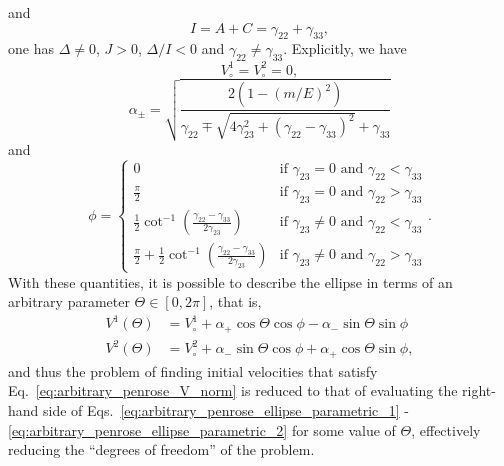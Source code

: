 %
and
%
\begin{equation}
  I = A + C = \gamma_{22} + \gamma_{33},
  \label{eq:arbitrary_penrose_quadratic_I}
\end{equation}
%
one has $\Delta \neq 0$, $J > 0$, $\Delta/I < 0$ and $\gamma_{22} \neq \gamma_{33}$. Explicitly, we have~\cite{Larson2006, Young2010, Lawrence2014}
%
\begin{equation}
  V^1_\circ = V^2_\circ = 0,
  \label{eq:arbitrary_penrose_ellipse_centers}
\end{equation}
%
\begin{equation}
  \alpha_\pm = \sqrt{ \frac{2 \left( 1 - \left(m/E\right)^2 \right)}{\gamma_{22} \mp \sqrt{4 \gamma_{23}^2 + \left( \gamma_{22} - \gamma_{33} \right)^2} +\gamma_{33}} }
  \label{eq:arbitrary_penrose_ellipse_axis}
\end{equation}
%
and
\begin{equation}
  \phi =
  \begin{cases}
    0                                                                                                 & \text{if } \gamma_{23} = 0 \text{ and } \gamma_{22} < \gamma_{33}    \\
    \frac{\pi}{2}                                                                                     & \text{if } \gamma_{23} = 0 \text{ and } \gamma_{22} > \gamma_{33}    \\
    \frac{1}{2} \cot^{-1} \left( \frac{\gamma_{22}-\gamma_{33}}{2\gamma_{23}} \right)                 & \text{if } \gamma_{23} \neq 0 \text{ and } \gamma_{22} < \gamma_{33} \\
    \frac{\pi}{2} + \frac{1}{2} \cot^{-1} \left( \frac{\gamma_{22}-\gamma_{33}}{2\gamma_{23}} \right) & \text{if } \gamma_{23} \neq 0 \text{ and } \gamma_{22} > \gamma_{33}
  \end{cases}
  .
  \label{eq:arbitrary_penrose_ellipse_angle}
\end{equation}
%
With these quantities, it is possible to describe the ellipse in terms of an arbitrary parameter $\Theta \in \left[0,2\pi\right]$, that is,
%
\begin{align}
  V^{1}\left(\Theta\right) & =  V^{1}_\circ + \alpha_{+} \cos\Theta\cos\phi - \alpha_{-}\sin\Theta\sin\phi                                                  \label{eq:arbitrary_penrose_ellipse_parametric_1} \\
  V^{2}\left(\Theta\right) & = V^{2}_\circ + \alpha_{-} \sin\Theta\cos\phi + \alpha_{+}\cos\Theta\sin\phi, \label{eq:arbitrary_penrose_ellipse_parametric_2}
\end{align}
%
and thus the problem of finding initial velocities that satisfy Eq.~\eqref{eq:arbitrary_penrose_V_norm} is reduced to that of evaluating the right-hand side of Eqs.~\eqref{eq:arbitrary_penrose_ellipse_parametric_1} - \eqref{eq:arbitrary_penrose_ellipse_parametric_2} for some value of $\Theta$, effectively reducing the ``degrees of freedom'' of the problem.

